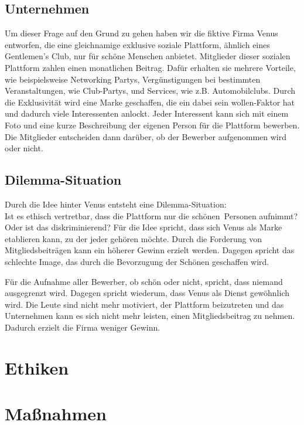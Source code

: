 \documentclass[a4paper, fontsize=12pt, parskip=full, toc=bibliographynumbered]{scrreprt}
\begin{document}
\section{Unternehmen}

Um dieser Frage auf den Grund zu gehen haben wir die fiktive Firma Venus entworfen, die eine gleichnamige exklusive soziale Plattform, ähnlich eines \glqq Gentlemen's Club\grqq, nur für schöne Menschen anbietet. Mitglieder dieser sozialen Plattform zahlen einen monatlichen Beitrag. Dafür erhalten sie mehrere Vorteile, wie beispielsweise Networking Partys, Vergünstigungen bei bestimmten Veranstaltungen, wie Club-Partys, und Services, wie z.B. Automobilclubs. Durch die Exklusivität wird eine Marke geschaffen, die ein \glqq dabei sein wollen\grqq-Faktor hat und dadurch viele Interessenten anlockt. Jeder Interessent kann sich mit einem Foto und eine kurze Beschreibung der eigenen Person für die Plattform bewerben. Die Mitglieder entscheiden dann darüber, ob der Bewerber aufgenommen wird oder nicht.

\section{Dilemma-Situation}
Durch die Idee hinter Venus entsteht eine Dilemma-Situation:\\
Ist es ethisch vertretbar, dass die Plattform nur die \glqq schönen\grqq~Personen aufnimmt? Oder ist das diskriminierend? Für die Idee spricht, dass sich Venus als Marke etablieren kann, zu der jeder gehören möchte. Durch die Forderung von Mitgliedsbeiträgen kann ein höherer Gewinn erzielt werden. Dagegen spricht das schlechte Image, das durch die Bevorzugung der Schönen geschaffen wird.

Für die Aufnahme aller Bewerber, ob schön oder nicht, spricht, dass niemand ausgegrenzt wird. Dagegen spricht wiederum, dass Venus als Dienst gewöhnlich wird. Die Leute sind nicht mehr motiviert, der Plattform beizutreten und das Unternehmen kann es sich nicht mehr leisten, einen Mitgliedsbeitrag zu nehmen. Dadurch erzielt die Firma weniger Gewinn.
\chapter{Ethiken}





\chapter{Maßnahmen}
\end{document}
